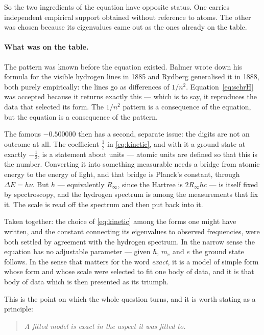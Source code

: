 \documentclass[11pt]{article}
\begin{document}
So the two ingredients of the equation have opposite status. One carries independent empirical
support obtained without reference to atoms. The other was chosen because its eigenvalues came out
as the ones already on the table.

\paragraph{What was on the table.}
The pattern was known before the equation existed. Balmer wrote down his formula for the visible
hydrogen lines in 1885 and Rydberg generalised it in 1888, both purely empirically: the lines go as
differences of $1/n^2$. Equation~\eqref{eq:schrH} was accepted because it returns exactly this ---
which is to say, it reproduces the data that selected its form. The $1/n^2$ pattern is a
consequence of the equation, but the equation is a consequence of the pattern.

The famous $-0.500000$ then has a second, separate issue: the digits are not an outcome at all.
The coefficient $\tfrac12$ in \eqref{eq:kinetic}, and with it a ground state at exactly
$-\tfrac12$, is a statement about units --- atomic units are defined so that this is the number.
Converting it into something measurable needs a bridge from atomic energy to the energy of light,
and that bridge is Planck's constant, through $\Delta E = h\nu$. But $h$ --- equivalently
$R_\infty$, since the Hartree is $2R_\infty hc$ --- is itself fixed by spectroscopy, and the
hydrogen spectrum is among the measurements that fix it. The scale is read off the spectrum and
then put back into it.

Taken together: the choice of \eqref{eq:kinetic} among the forms one might have written, and the
constant connecting its eigenvalues to observed frequencies, were both settled by agreement with
the hydrogen spectrum. In the narrow sense the equation has no adjustable parameter --- given
$\hbar$, $m_e$ and $e$ the ground state follows. In the sense that matters for the word
\emph{exact}, it is a model of simple form whose form and whose scale were selected to fit one
body of data, and it is that body of data which is then presented as its triumph.

This is the point on which the whole question turns, and it is worth stating as a principle:

\begin{quote}
\emph{A fitted model is exact in the aspect it was fitted to.}
\end{quote}
\end{document}
